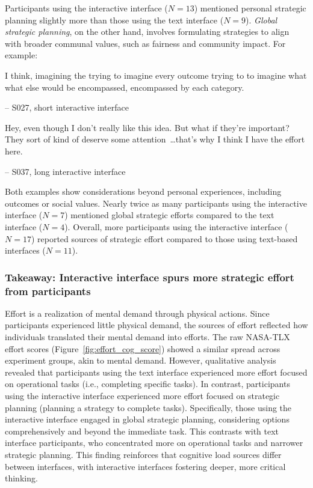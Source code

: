 Participants using the interactive interface ($N=13$) mentioned personal strategic planning slightly more than those using the text interface ($N=9$). \textit{Global strategic planning}, on the other hand, involves formulating strategies to align with broader communal values, such as fairness and community impact. For example:

\begin{displayquote}
I think, imagining the trying to imagine every outcome trying to to imagine what what else would be encompassed, encompassed by each category.

\noindent \hfill -- S027, short interactive interface
\end{displayquote}

\begin{displayquote}
Hey, even though I don't really like this idea. But what if they're important? They sort of kind of deserve some attention~\ldots that's why I think I have the effort here.

\noindent \hfill -- S037, long interactive interface
\end{displayquote}
    
Both examples show considerations beyond personal experiences, including outcomes or social values. Nearly twice as many participants using the interactive interface ($N=7$) mentioned global strategic efforts compared to the text interface ($N=4$). Overall, more participants using the interactive interface ($N=17$) reported sources of strategic effort compared to those using text-based interfaces ($N=11$).

\subsubsection{Takeaway: Interactive interface spurs more strategic effort from participants}
Effort is a realization of mental demand through physical actions. Since participants experienced little physical demand, the sources of effort reflected how individuals translated their mental demand into efforts. The raw NASA-TLX effort scores (Figure~\ref{fig:effort_cog_score}) showed a similar spread across experiment groups, akin to mental demand. However, qualitative analysis revealed that participants using the text interface experienced more effort focused on operational tasks (i.e., completing specific tasks). In contrast, participants using the interactive interface experienced more effort focused on strategic planning (planning a strategy to complete tasks). Specifically, those using the interactive interface engaged in global strategic planning, considering options comprehensively and beyond the immediate task. This contrasts with text interface participants, who concentrated more on operational tasks and narrower strategic planning. This finding reinforces that cognitive load sources differ between interfaces, with interactive interfaces fostering deeper, more critical thinking.

